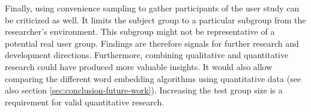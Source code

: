 Finally, using convenience sampling to gather participants of the user study can be criticized as well.
It limits the subject group to a particular subgroup from the researcher's environment.
This subgroup might not be representative of a potential real user group.
Findings are therefore signals for further research and development directions.
Furthermore, combining qualitative and quantitative research could have produced more valuable insights.
It would also allow comparing the different word embedding algorithms using quantitative data (see also section \ref{sec:conclusion-future-work}).
Increasing the test group size is a requirement for valid quantitative research.
